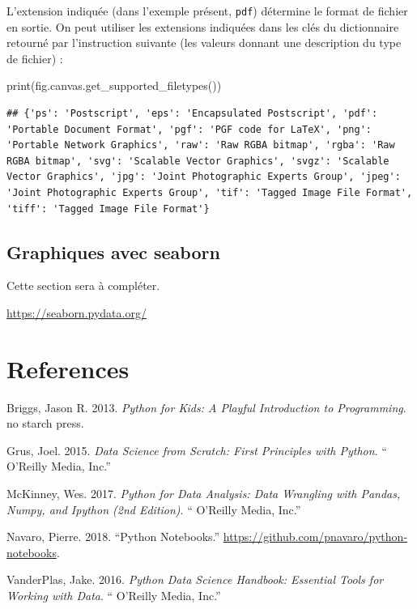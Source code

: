 \documentclass[12pt,]{book}
\newenvironment{Shaded}{\begin{snugshade}}{\end{snugshade}}
\newcommand{\BuiltInTok}[1]{#1}
\newcommand{\NormalTok}[1]{#1}
\numberwithin{equation}{section}
\numberwithin{countremarque}{section}
\begin{document}
L'extension indiquée (dans l'exemple présent, \texttt{pdf}) détermine le
format de fichier en sortie. On peut utiliser les extensions indiquées
dans les clés du dictionnaire retourné par l'instruction suivante (les
valeurs donnant une description du type de fichier) :

\begin{Shaded}
\begin{Highlighting}[]
\BuiltInTok{print}\NormalTok{(fig.canvas.get_supported_filetypes())}
\end{Highlighting}
\end{Shaded}

\begin{lstlisting}
## {'ps': 'Postscript', 'eps': 'Encapsulated Postscript', 'pdf': 'Portable Document Format', 'pgf': 'PGF code for LaTeX', 'png': 'Portable Network Graphics', 'raw': 'Raw RGBA bitmap', 'rgba': 'Raw RGBA bitmap', 'svg': 'Scalable Vector Graphics', 'svgz': 'Scalable Vector Graphics', 'jpg': 'Joint Photographic Experts Group', 'jpeg': 'Joint Photographic Experts Group', 'tif': 'Tagged Image File Format', 'tiff': 'Tagged Image File Format'}
\end{lstlisting}

\section{Graphiques avec seaborn}\label{graphiques-avec-seaborn}

Cette section sera à compléter.

\url{https://seaborn.pydata.org/}

\chapter{References}\label{references}

\hypertarget{refs}{}
\hypertarget{ref-briggs_2013_python}{}
Briggs, Jason R. 2013. \emph{Python for Kids: A Playful Introduction to
Programming}. no starch press.

\hypertarget{ref-grus_2015_data}{}
Grus, Joel. 2015. \emph{Data Science from Scratch: First Principles with
Python}. `` O'Reilly Media, Inc.''

\hypertarget{ref-mckinney_2017_python}{}
McKinney, Wes. 2017. \emph{Python for Data Analysis: Data Wrangling with
Pandas, Numpy, and Ipython (2nd Edition)}. `` O'Reilly Media, Inc.''

\hypertarget{ref-navaro_python}{}
Navaro, Pierre. 2018. ``Python Notebooks.''
\url{https://github.com/pnavaro/python-notebooks}.

\hypertarget{ref-vanderplas2016python}{}
VanderPlas, Jake. 2016. \emph{Python Data Science Handbook: Essential
Tools for Working with Data}. `` O'Reilly Media, Inc.''
\end{document}
